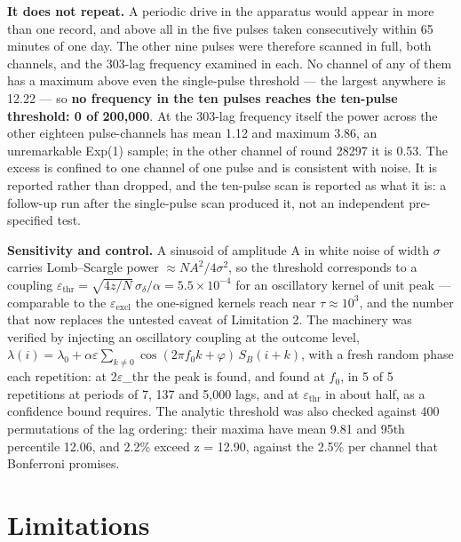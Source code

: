 \documentclass[
  11pt,
]{article}
\begin{document}
\textbf{It does not repeat.} A periodic drive in the apparatus would
appear in more than one record, and above all in the five pulses taken
consecutively within 65 minutes of one day. The other nine pulses were
therefore scanned in full, both channels, and the 303-lag frequency
examined in each. No channel of any of them has a maximum above even the
single-pulse threshold --- the largest anywhere is 12.22 --- so
\textbf{no frequency in the ten pulses reaches the ten-pulse threshold:
0 of 200,000}. At the 303-lag frequency itself the power across the
other eighteen pulse-channels has mean 1.12 and maximum 3.86, an
unremarkable Exp(1) sample; in the other channel of round 28297 it is
0.53. The excess is confined to one channel of one pulse and is
consistent with noise. It is reported rather than dropped, and the
ten-pulse scan is reported as what it is: a follow-up run after the
single-pulse scan produced it, not an independent pre-specified test.

\textbf{Sensitivity and control.} A sinusoid of amplitude A in white
noise of width \(\sigma\) carries Lomb--Scargle power
\(\approx N A^2/4\sigma^2\), so the threshold corresponds to a coupling
\(\varepsilon_{\mathrm{thr}} = \sqrt{4z/N}\,\sigma_\delta/\alpha = 5.5\times10^{-4}\)
for an oscillatory kernel of unit peak --- comparable to the
\(\varepsilon_{\mathrm{excl}}\) the one-signed kernels reach near
\(\tau \approx 10^{3}\), and the number that now replaces the untested
caveat of Limitation 2. The machinery was verified by injecting an
oscillatory coupling at the outcome level,
\(\lambda(i) = \lambda_0 + \alpha\varepsilon \sum_{k \neq 0} \cos(2\pi f_0 k + \varphi)\, S_B(i+k)\),
with a fresh random phase each repetition: at 2\(\varepsilon\)\_thr the
peak is found, and found at \(f_{0}\), in 5 of 5 repetitions at periods
of 7, 137 and 5,000 lags, and at \(\varepsilon_{\mathrm{thr}}\) in about
half, as a confidence bound requires. The analytic threshold was also
checked against 400 permutations of the lag ordering: their maxima have
mean 9.81 and 95th percentile 12.06, and 2.2\% exceed z = 12.90, against
the 2.5\% per channel that Bonferroni promises.

\section{Limitations}
\end{document}
